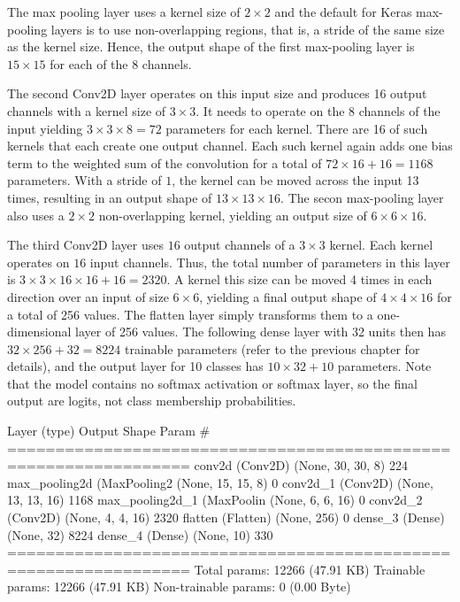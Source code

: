 \begin{withcode}
The max pooling layer uses a kernel size of $2 \times 2$ and the default for Keras max-pooling layers is to use non-overlapping regions, that is, a stride of the same size as the kernel size. Hence, the output shape of the first max-pooling layer is $15 \times 15$ for each of the 8 channels. 

The second Conv2D layer operates on this input size and produces 16 output channels with a kernel size of $3 \times 3$. It needs to operate on the 8 channels of the input yielding $3 \times 3 \times 8 = 72$ parameters for each kernel. There are 16 of such kernels that each create one output channel. Each such kernel again adds one bias term to the weighted sum of the convolution for a total of $72 \times 16 + 16 = 1168$ parameters. With a stride of $1$, the kernel can be moved across the input 13 times, resulting in an output shape of $13 \times 13 \times 16$. The secon max-pooling layer also uses a $2 \times 2$ non-overlapping kernel, yielding an output size of $6 \times 6 \times 16$.

The third Conv2D layer uses $16$ output channels of a $3 \times 3$ kernel. Each kernel operates on $16$ input channels. Thus, the total number of parameters in this layer is $3 \times 3 \times 16 \times 16 + 16 = 2320$. A kernel this size can be moved 4 times in each direction over an input of size $6 \times 6$, yielding a final output shape of $4 \times 4 \times 16$ for a total of 256 values. The flatten layer simply transforms them to a one-dimensional layer of 256 values. The following dense layer with 32 units then has $32 \times 256 + 32 = 8224$ trainable parameters (refer to the previous chapter for details), and the output layer for 10 classes has $10 \times 32 + 10$ parameters. Note that the model contains no softmax activation or softmax layer, so the final output are logits, not class membership probabilities. 

\begin{textcode}
 Layer (type)                Output Shape              Param #   
=================================================================
 conv2d (Conv2D)             (None, 30, 30, 8)         224       
 max_pooling2d (MaxPooling2  (None, 15, 15, 8)         0         
 conv2d_1 (Conv2D)           (None, 13, 13, 16)        1168      
 max_pooling2d_1 (MaxPoolin  (None, 6, 6, 16)          0         
 conv2d_2 (Conv2D)           (None, 4, 4, 16)          2320      
 flatten (Flatten)           (None, 256)               0         
 dense_3 (Dense)             (None, 32)                8224      
 dense_4 (Dense)             (None, 10)                330       
=================================================================
Total params: 12266 (47.91 KB)
Trainable params: 12266 (47.91 KB)
Non-trainable params: 0 (0.00 Byte)
\end{textcode}


\end{withcode}
